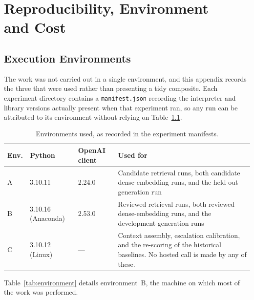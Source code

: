 \chapter[Reproducibility and Cost]{Reproducibility, Environment\texorpdfstring{\\}{ }and Cost}
\label{app:reproducibility}

\section{Execution Environments}

The work was not carried out in a single environment, and this appendix records
the three that were used rather than presenting a tidy composite. Each experiment
directory contains a \texttt{manifest.json} recording the interpreter and library
versions actually present when that experiment ran, so any run can be attributed
to its environment without relying on Table~\ref{tab:environments}.

\begin{table}[htbp]
  \centering
  \caption{Environments used, as recorded in the experiment manifests.}
  \label{tab:environments}
  \small
  \begin{tabularx}{\textwidth}{@{}l l l X@{}}
    \toprule
    \textbf{Env.} & \textbf{Python} & \textbf{OpenAI client} & \textbf{Used for} \\
    \midrule
    A & 3.10.11 & 2.24.0 &
      Candidate retrieval runs, both candidate dense-embedding runs, and the
      held-out generation run \\
    B & 3.10.16 (Anaconda) & 2.53.0 &
      Reviewed retrieval runs, both reviewed dense-embedding runs, and the
      development generation runs \\
    C & 3.10.12 (Linux) & --- &
      Context assembly, escalation calibration, and the re-scoring of the
      historical baselines. No hosted call is made by any of these. \\
    \bottomrule
  \end{tabularx}
\end{table}

Table~\ref{tab:environment} details environment~B, the machine on which most of the work was performed.

